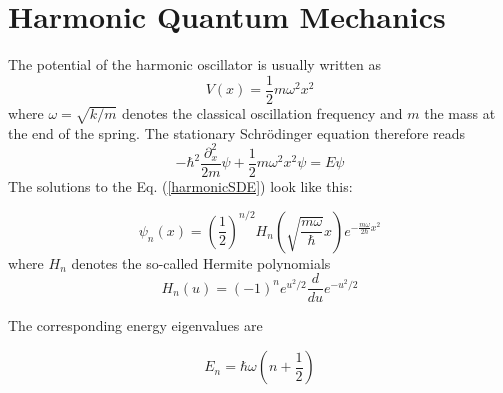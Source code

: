 \section{Harmonic Quantum Mechanics}
The potential of the harmonic oscillator is usually written as
$$
V(x)=\frac{1}{2} m \omega^{2} x^{2}
$$
where $\omega=\sqrt{k / m}$ denotes the classical oscillation frequency and $m$ the mass at the end of the spring. The stationary Schrödinger equation therefore reads
\begin{equation}
-\hbar^{2} \frac{\partial_{x}^{2}}{2 m} \psi+\frac{1}{2} m \omega^{2} x^{2} \psi=E \psi
\label{harmonicSDE}
\end{equation}
The solutions to the Eq. (\ref{harmonicSDE}) look like this:
\begin{qt}
\begin{equation}
\psi_{n}(x)=\left(\frac{1}{2}\right)^{n / 2} H_{n}(\sqrt{\frac{m \omega}{\hbar}} x) e^{-\frac{m \omega}{2 \hbar} x^{2}}
\end{equation}
where $H_{n}$ denotes the so-called Hermite polynomials
$$
H_{n}(u)=(-1)^{n} e^{u^{2} / 2} \frac{d}{d u} e^{-u^{2} / 2}
$$
\end{qt}
The corresponding energy eigenvalues are
\begin{qt}
\begin{equation}
E_{n}=\hbar \omega\left(n+\frac{1}{2}\right)
\end{equation}
\end{qt}
